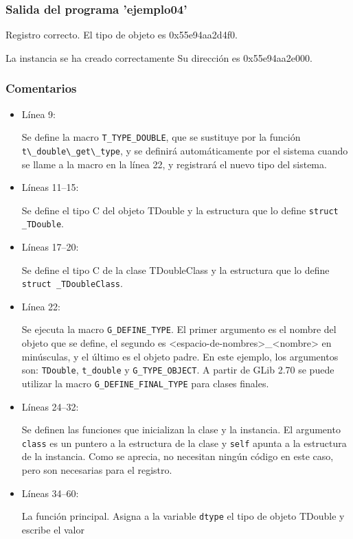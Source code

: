  \subsubsection{Salida del programa 'ejemplo04'}
\textsf{Registro correcto. El tipo de objeto es 0x55e94aa2d4f0.}\par
\textsf{La instancia se ha creado correctamente Su dirección es 0x55e94aa2e000.}\par

\subsubsection{Comentarios}
\begin{itemize}
\item Línea 9:\par
  Se define la macro \texttt{T\_TYPE\_DOUBLE}, que se sustituye por la función
  \passthrough{\lstinline!t\_double\_get\_type!}, y se definirá automáticamente por el sistema cuando
  se llame a la macro en la línea 22, y registrará el nuevo tipo del sistema.
\item Líneas 11--15:\par
  Se define el tipo C del objeto \textsf{TDouble} y la estructura que lo define \texttt{struct \_TDouble}.
\item Líneas 17--20:\par
  Se define el tipo C de la clase \textsf{TDoubleClass} y la estructura que lo define \texttt{struct \_TDoubleClass}.
\item Línea 22:\par
  Se ejecuta la macro \texttt{G\_DEFINE\_TYPE}. El primer argumento es el nombre del objeto que se define,
  el segundo es \textsf{<espacio-de-nombres>\_<nombre>} en minúsculas, y el último es el objeto padre.
  En este ejemplo, los argumentos son: \texttt{TDouble}, \texttt{t\_double} y \texttt{G\_TYPE\_OBJECT}.
  A partir de \textsf{GLib 2.70} se puede utilizar la macro \texttt{G\_DEFINE\_FINAL\_TYPE} para clases finales.
\item Líneas 24--32:\par
  Se definen las funciones que inicializan la clase y la instancia. El argumento \texttt{class} es un puntero a la
  estructura de la clase y \texttt{self} apunta a la estructura de la instancia. Como se aprecia, no
  necesitan ningún código en este caso, pero son necesarias para el registro.
\item Líneas 34--60:\par
  La función principal. Asigna a la variable \texttt{dtype} el tipo de objeto \textsf{TDouble} y escribe el valor

\end{itemize}
